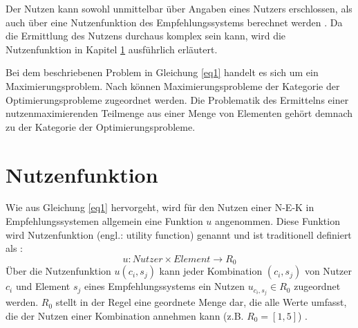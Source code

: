Der Nutzen kann sowohl unmittelbar über Angaben eines Nutzers erschlossen, als auch über eine Nutzenfunktion des Empfehlungssystems berechnet werden \cite[S. 735]{adomavicius:inproceedings}.
Da die Ermittlung des Nutzens durchaus komplex sein kann, wird die Nutzenfunktion in Kapitel \ref{ch:empfehlungssysteme:nutzenfunktion} ausführlich erläutert.

Bei dem beschriebenen Problem in Gleichung \ref{eq1} handelt es sich um ein Maximierungsproblem.
Nach \textcite[S. 1]{book:kallrath} können Maximierungsprobleme der Kategorie der Optimierungsprobleme zugeordnet werden.
Die Problematik des Ermittelns einer nutzenmaximierenden Teilmenge aus einer Menge von Elementen gehört demnach zu der Kategorie der Optimierungsprobleme.

\section{Nutzenfunktion} %
\label{ch:empfehlungssysteme:nutzenfunktion}
Wie aus Gleichung \ref{eq1} hervorgeht, wird für den Nutzen einer \ac{N-E-K} in Empfehlungssystemen allgemein eine Funktion $u$ angenommen.
Diese Funktion wird Nutzenfunktion (engl.: utility function) genannt und ist traditionell definiert als \cite[S. 195]{adomavicius:3:inbook}\cite[S. 3]{jawaheer:article}\cite[S. 1156]{gupta:inproceedings}\cite[S. 219]{lakiotaki:inproceedings}:
\begin{equation}\label{eq2}%
    u: Nutzer \times Element \rightarrow R_{0}
\end{equation}
Über die Nutzenfunktion $u(c_{i},s_{j})$ kann jeder Kombination $(c_{i},s_{j})$ von Nutzer $c_{i}$ und Element $s_{j}$ eines Empfehlungssystems ein Nutzen $u_{c_{i},s_{j}} \in R_{0}$ zugeordnet werden.
$R_{0}$ stellt in der Regel eine geordnete Menge dar, die alle Werte umfasst, die der Nutzen einer Kombination annehmen kann (z.B. $R_{0} = [1,5]$) \cite[S. 49]{adomavicius:inproceedings:2}.

